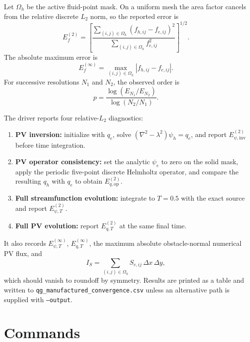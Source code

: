 \documentclass[11pt]{article}
\newcommand{\lap}{\nabla^2}
\newcommand{\Om}{\Omega}
\begin{document}
Let $\Om_h$ be the active fluid-point mask.  On a uniform mesh the area
factor cancels from the relative discrete $L_2$ norm, so the reported error
is
\begin{equation}
  E_f^{(2)}
  =\left[
    \frac{\sum_{(i,j)\in\Om_h}(f_{h,ij}-f_{e,ij})^2}
         {\sum_{(i,j)\in\Om_h}f_{e,ij}^2}
  \right]^{1/2}.
  \label{eq:l2-error}
\end{equation}
The absolute maximum error is
\begin{equation}
  E_f^{(\infty)}
  =\max_{(i,j)\in\Om_h}|f_{h,ij}-f_{e,ij}|.
  \label{eq:linf-error}
\end{equation}
For successive resolutions $N_1$ and $N_2$, the observed order is
\begin{equation}
  p
  =\frac{\log(E_{N_1}/E_{N_2})}{\log(N_2/N_1)}.
  \label{eq:observed-order}
\end{equation}

The driver reports four relative-$L_2$ diagnostics:
\begin{enumerate}
  \item \textbf{PV inversion:} initialize with $q_e$, solve
    $(\lap-\lambda^2)\psi_h=q_e$, and report
    $E_{\psi,\mathrm{inv}}^{(2)}$ before time integration.
  \item \textbf{PV operator consistency:} set the analytic $\psi_e$ to zero
    on the solid mask, apply the periodic five-point discrete Helmholtz
    operator, and compare the resulting $q_h$ with $q_e$ to obtain
    $E_{q,\mathrm{op}}^{(2)}$.
  \item \textbf{Full streamfunction evolution:} integrate to $T=0.5$ with
    the exact source and report $E_{\psi,T}^{(2)}$.
  \item \textbf{Full PV evolution:} report $E_{q,T}^{(2)}$ at the same final
    time.
\end{enumerate}
It also records $E_{\psi,T}^{(\infty)}$, $E_{q,T}^{(\infty)}$, the maximum
absolute obstacle-normal numerical PV flux, and
\begin{equation}
  I_S=\sum_{(i,j)\in\Om_h}S_{e,ij}\,\Delta x\,\Delta y,
\end{equation}
which should vanish to roundoff by symmetry.  Results are printed as a
table and written to \texttt{qg\_manufactured\_convergence.csv} unless an
alternative path is supplied with \texttt{--output}.

\section{Commands}
\end{document}
